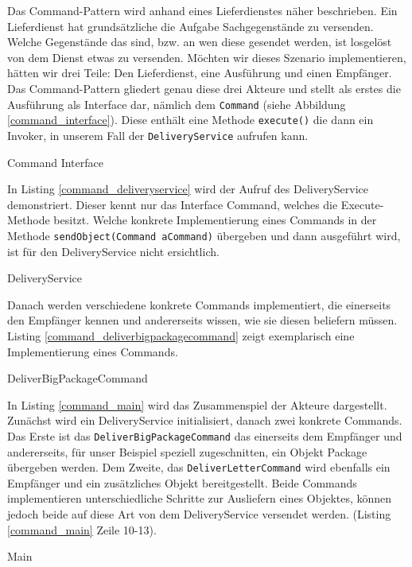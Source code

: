 Das Command-Pattern wird anhand eines Lieferdienstes näher beschrieben. Ein Lieferdienst hat grundsätzliche die Aufgabe Sachgegenstände zu versenden. Welche Gegenstände das sind, bzw. an wen diese gesendet werden, ist losgelöst von dem Dienst etwas zu versenden. Möchten wir dieses Szenario implementieren, hätten wir drei Teile: Den Lieferdienst, eine Ausführung und einen Empfänger. Das Command-Pattern gliedert genau diese drei Akteure und stellt als erstes die Ausführung als Interface dar, nämlich dem \texttt{Command} (siehe Abbildung \ref{command_interface}). Diese enthält eine Methode \texttt{execute()} die dann ein Invoker, in unserem Fall der \texttt{DeliveryService} aufrufen kann. 


\begin{listing}[h!]
   \centering
   \caption{Command Interface}
    \label{command_interface}
\end{listing}  

In Listing \ref{command_deliveryservice} wird der Aufruf des DeliveryService demonstriert. Dieser kennt nur das Interface Command, welches die Execute-Methode besitzt. Welche konkrete Implementierung eines Commands in der Methode \texttt{sendObject(Command aCommand)} übergeben und dann ausgeführt wird, ist für den DeliveryService nicht ersichtlich. 

\begin{listing}[h!]
   \centering
   \caption{DeliveryService}
    \label{command_deliveryservice}
\end{listing} 

Danach werden verschiedene konkrete Commands implementiert, die einerseits den Empfänger kennen und andererseits wissen, wie sie diesen beliefern müssen. Listing \ref{command_deliverbigpackagecommand} zeigt exemplarisch eine Implementierung eines Commands. 


\begin{listing}[h!]
   \centering
   \caption{DeliverBigPackageCommand}
    \label{command_deliverbigpackagecommand}
\end{listing}  

In Listing \ref{command_main} wird das Zusammenspiel der Akteure dargestellt. Zunächst wird ein DeliveryService initialisiert, danach zwei konkrete Commands. Das Erste ist das \texttt{DeliverBigPackageCommand} das einerseits dem Empfänger und andererseits, für unser Beispiel speziell zugeschnitten, ein Objekt Package übergeben werden. Dem Zweite, das \texttt{DeliverLetterCommand} wird ebenfalls ein Empfänger und ein zusätzliches Objekt bereitgestellt. Beide Commands implementieren unterschiedliche Schritte zur Ausliefern eines Objektes, können jedoch beide auf diese Art von dem DeliveryService versendet werden. (Listing \ref{command_main} Zeile 10-13).

\begin{listing}[h!]
   \centering
   \caption{Main}
    \label{command_main}
\end{listing}  
